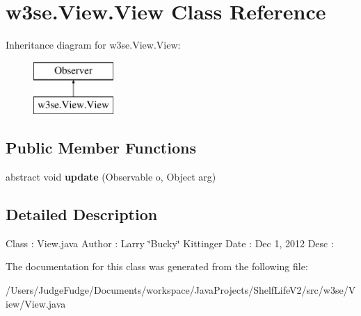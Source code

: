 \hypertarget{classw3se_1_1_view_1_1_view}{\section{w3se.\-View.\-View Class Reference}
\label{classw3se_1_1_view_1_1_view}
}
Inheritance diagram for w3se.\-View.\-View\-:\begin{figure}[H]
\begin{center}
\leavevmode
\includegraphics[height=2.000000cm]{classw3se_1_1_view_1_1_view}
\end{center}
\end{figure}
\subsection*{Public Member Functions}
\begin{DoxyCompactItemize}
\item 
\hypertarget{classw3se_1_1_view_1_1_view_a8fe281d1c3796290b2be01cdce3b9b1f}{abstract void {\bfseries update} (Observable o, Object arg)}\label{classw3se_1_1_view_1_1_view_a8fe281d1c3796290b2be01cdce3b9b1f}

\end{DoxyCompactItemize}


\subsection{Detailed Description}
Class \-: View.\-java Author \-: Larry \char`\"{}\-Bucky\char`\"{} Kittinger Date \-: Dec 1, 2012 Desc \-: 

The documentation for this class was generated from the following file\-:\begin{DoxyCompactItemize}
\item 
/\-Users/\-Judge\-Fudge/\-Documents/workspace/\-Java\-Projects/\-Shelf\-Life\-V2/src/w3se/\-View/View.\-java\end{DoxyCompactItemize}
